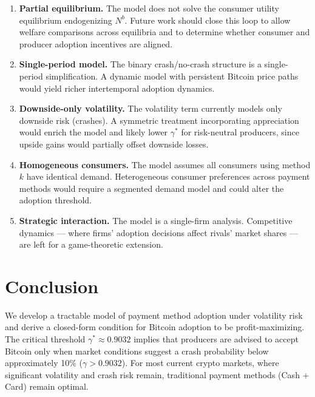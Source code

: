 \documentclass{article}
\begin{document}
\begin{enumerate}
  \item \textbf{Partial equilibrium.}
        The model does not solve the consumer utility equilibrium endogenizing
        $N^b$.
        Future work should close this loop to allow welfare comparisons across
        equilibria and to determine whether consumer and producer adoption
        incentives are aligned.
  \item \textbf{Single-period model.}
        The binary crash/no-crash structure is a single-period simplification.
        A dynamic model with persistent Bitcoin price paths would yield richer
        intertemporal adoption dynamics.
  \item \textbf{Downside-only volatility.}
        The volatility term currently models only downside risk (crashes).
        A symmetric treatment incorporating appreciation would enrich the model
        and likely lower $\gamma^*$ for risk-neutral producers, since upside
        gains would partially offset downside losses.
  \item \textbf{Homogeneous consumers.}
        The model assumes all consumers using method $k$ have identical demand.
        Heterogeneous consumer preferences across payment methods would require
        a segmented demand model and could alter the adoption threshold.
  \item \textbf{Strategic interaction.}
        The model is a single-firm analysis.
        Competitive dynamics --- where firms' adoption decisions affect rivals'
        market shares --- are left for a game-theoretic extension.
\end{enumerate}

\section{Conclusion}
\label{sec:conclusion}

We develop a tractable model of payment method adoption under volatility risk
and derive a closed-form condition for Bitcoin adoption to be profit-maximizing.
The critical threshold $\gamma^* \approx 0.9032$ implies that producers are
advised to accept Bitcoin only when market conditions suggest a crash
probability below approximately 10\% ($\gamma > 0.9032$).
For most current crypto markets, where significant volatility and crash risk
remain, traditional payment methods (Cash + Card) remain optimal.
\end{document}
